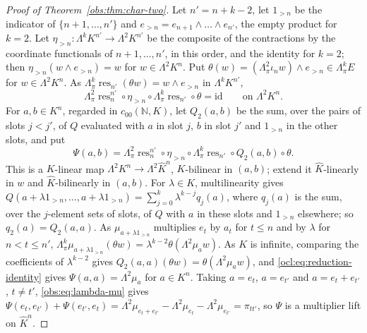 \documentclass[11pt]{amsart}
\theoremstyle{definition}
\theoremstyle{remark}
\numberwithin{equation}{section}
\newcommand{\N}{\mathbb N}
\newcommand{\id}{\mathrm{id}}
\theoremstyle{plain}
\theoremstyle{definition}
\theoremstyle{plain}
\begin{document}
\begin{proof}[Proof of Theorem~\ref{obs:thm:char-two}]
Let $n'=n+k-2$, let $1_{>n}$ be the indicator of $\{n+1,\dots,n'\}$ and $e_{>n}=e_{n+1}\wedge\dots\wedge e_{n'}$, the
empty product for $k=2$. Let $\eta_{>n}\colon\Lambda^kK^{n'}\to\Lambda^2K^{n'}$ be the composite of the contractions by
the coordinate functionals of $n+1,\dots,n'$, in this order, and the identity for $k=2$; then
$\eta_{>n}(w\wedge e_{>n})=w$ for $w\in\Lambda^2K^n$. Put $\theta(w)=(\Lambda^2_\pi\iota_nw)\wedge
e_{>n}\in\Lambda^k_\pi E$ for $w\in\Lambda^2K^n$. As $\Lambda^k_\pi\operatorname{res}_{n'}(\theta w)=w\wedge e_{>n}$ in
$\Lambda^kK^{n'}$,
\begin{equation}\label{ocl:eq:reduction-identity}
\Lambda^2_\pi\operatorname{res}^{n'}_n\circ\eta_{>n}\circ\Lambda^k_\pi\operatorname{res}_{n'}\circ\theta=\id
\qquad\text{on }\Lambda^2K^n.
\end{equation}
For $a,b\in K^n$, regarded in $c_{00}(\N,K)$, let $Q_2(a,b)$ be the sum, over the pairs of slots $j<j'$, of $Q$
evaluated with $a$ in slot $j$, $b$ in slot $j'$ and $1_{>n}$ in the other slots, and put
\begin{equation}\label{ocl:eq:reduced-lift}
\Psi(a,b)=\Lambda^2_\pi\operatorname{res}^{n'}_n\circ\eta_{>n}\circ\Lambda^k_\pi\operatorname{res}_{n'}\circ
Q_2(a,b)\circ\theta .
\end{equation}
This is a $K$-linear map $\Lambda^2K^n\to\Lambda^2\widehat K^n$, $K$-bilinear in $(a,b)$; extend it $\widehat K$-linearly
in $w$ and $\widehat K$-bilinearly in $(a,b)$. For $\lambda\in K$, multilinearity gives
$Q(a+\lambda1_{>n},\dots,a+\lambda1_{>n})=\sum_{j=0}^k\lambda^{k-j}q_j(a)$, where $q_j(a)$ is the sum, over the
$j$-element sets of slots, of $Q$ with $a$ in these slots and $1_{>n}$ elsewhere; so $q_2(a)=Q_2(a,a)$. As
$\mu_{a+\lambda1_{>n}}$ multiplies $e_t$ by $a_t$ for $t\le n$ and by $\lambda$ for $n<t\le n'$,
$\Lambda^k_\pi\mu_{a+\lambda1_{>n}}(\theta w)=\lambda^{k-2}\theta(\Lambda^2\mu_aw)$. As $K$ is infinite, comparing the
coefficients of $\lambda^{k-2}$ gives $Q_2(a,a)(\theta w)=\theta(\Lambda^2\mu_aw)$, and
\eqref{ocl:eq:reduction-identity} gives $\Psi(a,a)=\Lambda^2\mu_a$ for $a\in K^n$. Taking $a=e_t$, $a=e_{t'}$ and
$a=e_t+e_{t'}$, $t\ne t'$, \eqref{obs:eq:lambda-mu} gives
$\Psi(e_t,e_{t'})+\Psi(e_{t'},e_t)=\Lambda^2\mu_{e_t+e_{t'}}-\Lambda^2\mu_{e_t}-\Lambda^2\mu_{e_{t'}}=\pi_{tt'}$, so
$\Psi$ is a multiplier lift on $\widehat K^n$.


\end{proof}
\end{document}
